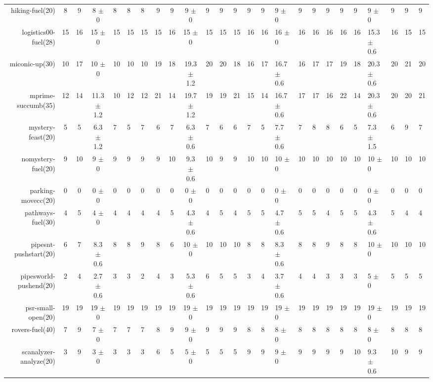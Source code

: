 \begin{center}
\begin{tabular}{|rcccHHH|cccHHHHHHHHHHHHHHH|}
hiking-fuel(20) & 8 & 9 & 8 \(\pm\) 0 & 8 & 8 & 8 & 9 & 9 & 9 \(\pm\) 0 & 9 & 9 & 9 & 9 & 9 & 9 \(\pm\) 0 & 9 & 9 & 9 & 9 & 9 & 9 \(\pm\) 0 & 9 & 9 & 9\\
logistics00-fuel(28) & 15 & 16 & 15 \(\pm\) 0 & 15 & 15 & 15 & 15 & 16 & 15 \(\pm\) 0 & 15 & 15 & 15 & 16 & 16 & 16 \(\pm\) 0 & 16 & 16 & 16 & 16 & 16 & 15.3 \(\pm\) 0.6 & 16 & 15 & 15\\
miconic-up(30) & 10 & 17 & 10 \(\pm\) 0 & 10 & 10 & 10 & 19 & 18 & 19.3 \(\pm\) 1.2 & 20 & 20 & 18 & 16 & 17 & 16.7 \(\pm\) 0.6 & 16 & 17 & 17 & 19 & 18 & 20.3 \(\pm\) 0.6 & 20 & 21 & 20\\
mprime-succumb(35) & 12 & 14 & 11.3 \(\pm\) 1.2 & 10 & 12 & 12 & 21 & 14 & 19.7 \(\pm\) 1.2 & 19 & 19 & 21 & 15 & 14 & 16.7 \(\pm\) 0.6 & 17 & 17 & 16 & 22 & 14 & 20.3 \(\pm\) 0.6 & 20 & 20 & 21\\
mystery-feast(20) & 5 & 5 & 6.3 \(\pm\) 1.2 & 7 & 5 & 7 & 6 & 7 & 6.3 \(\pm\) 0.6 & 7 & 6 & 6 & 7 & 5 & 7.7 \(\pm\) 0.6 & 7 & 8 & 8 & 6 & 5 & 7.3 \(\pm\) 1.5 & 6 & 9 & 7\\
nomystery-fuel(20) & 9 & 10 & 9 \(\pm\) 0 & 9 & 9 & 9 & 9 & 10 & 9.3 \(\pm\) 0.6 & 10 & 9 & 9 & 10 & 10 & 10 \(\pm\) 0 & 10 & 10 & 10 & 10 & 10 & 10 \(\pm\) 0 & 10 & 10 & 10\\
parking-movecc(20) & 0 & 0 & 0 \(\pm\) 0 & 0 & 0 & 0 & 0 & 0 & 0 \(\pm\) 0 & 0 & 0 & 0 & 0 & 0 & 0 \(\pm\) 0 & 0 & 0 & 0 & 0 & 0 & 0 \(\pm\) 0 & 0 & 0 & 0\\
pathways-fuel(30) & 4 & 5 & 4 \(\pm\) 0 & 4 & 4 & 4 & 4 & 5 & 4.3 \(\pm\) 0.6 & 4 & 5 & 4 & 5 & 5 & 4.7 \(\pm\) 0.6 & 5 & 5 & 4 & 5 & 5 & 4.3 \(\pm\) 0.6 & 5 & 4 & 4\\
pipesnt-pushstart(20) & 6 & 7 & 8.3 \(\pm\) 0.6 & 8 & 8 & 9 & 8 & 6 & 10 \(\pm\) 0 & 10 & 10 & 10 & 8 & 8 & 8.3 \(\pm\) 0.6 & 8 & 8 & 9 & 8 & 8 & 10 \(\pm\) 0 & 10 & 10 & 10\\
pipesworld-pushend(20) & 2 & 4 & 2.7 \(\pm\) 0.6 & 3 & 3 & 2 & 4 & 3 & 5.3 \(\pm\) 0.6 & 6 & 5 & 5 & 3 & 4 & 3.7 \(\pm\) 0.6 & 4 & 4 & 3 & 3 & 3 & 5 \(\pm\) 0 & 5 & 5 & 5\\
psr-small-open(20) & 19 & 19 & 19 \(\pm\) 0 & 19 & 19 & 19 & 19 & 19 & 19 \(\pm\) 0 & 19 & 19 & 19 & 19 & 19 & 19 \(\pm\) 0 & 19 & 19 & 19 & 19 & 19 & 19 \(\pm\) 0 & 19 & 19 & 19\\
rovers-fuel(40) & 7 & 9 & 7 \(\pm\) 0 & 7 & 7 & 7 & 8 & 9 & 9 \(\pm\) 0 & 9 & 9 & 9 & 8 & 8 & 8 \(\pm\) 0 & 8 & 8 & 8 & 8 & 8 & 8 \(\pm\) 0 & 8 & 8 & 8\\
scanalyzer-analyze(20) & 3 & 9 & 3 \(\pm\) 0 & 3 & 3 & 3 & 6 & 5 & 5 \(\pm\) 0 & 5 & 5 & 5 & 9 & 9 & 9 \(\pm\) 0 & 9 & 9 & 9 & 9 & 10 & 9.3 \(\pm\) 0.6 & 10 & 9 & 9\\

\end{tabular}
\end{center}
